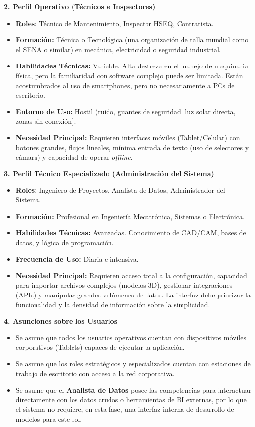 \textbf{2. Perfil Operativo (Técnicos e Inspectores)}
\begin{itemize}
    \item \textbf{Roles:} Técnico de Mantenimiento, Inspector HSEQ, Contratista.
    \item \textbf{Formación:} Técnica o Tecnológica (una organización de talla mundial como el SENA o similar) en mecánica, electricidad o seguridad industrial.
    \item \textbf{Habilidades Técnicas:} Variable. Alta destreza en el manejo de maquinaria física, pero la familiaridad con software complejo puede ser limitada. Están acostumbrados al uso de smartphones, pero no necesariamente a PCs de escritorio.
    \item \textbf{Entorno de Uso:} Hostil (ruido, guantes de seguridad, luz solar directa, zonas sin conexión).
    \item \textbf{Necesidad Principal:} Requieren interfaces móviles (Tablet/Celular) con botones grandes, flujos lineales, mínima entrada de texto (uso de selectores y cámara) y capacidad de operar \textit{offline}.
\end{itemize}

\textbf{3. Perfil Técnico Especializado (Administración del Sistema)}
\begin{itemize}
    \item \textbf{Roles:} Ingeniero de Proyectos, Analista de Datos, Administrador del Sistema.
    \item \textbf{Formación:} Profesional en Ingeniería Mecatrónica, Sistemas o Electrónica.
    \item \textbf{Habilidades Técnicas:} Avanzadas. Conocimiento de CAD/CAM, bases de datos, y lógica de programación.
    \item \textbf{Frecuencia de Uso:} Diaria e intensiva.
    \item \textbf{Necesidad Principal:} Requieren acceso total a la configuración, capacidad para importar archivos complejos (modelos 3D), gestionar integraciones (APIs) y manipular grandes volúmenes de datos. La interfaz debe priorizar la funcionalidad y la densidad de información sobre la simplicidad.
\end{itemize}

\textbf{4. Asunciones sobre los Usuarios}
\begin{itemize}
    \item Se asume que todos los usuarios operativos cuentan con dispositivos móviles corporativos (Tablets) capaces de ejecutar la aplicación.
    \item Se asume que los roles estratégicos y especializados cuentan con estaciones de trabajo de escritorio con acceso a la red corporativa.
    \item Se asume que el \textbf{Analista de Datos} posee las competencias para interactuar directamente con los datos crudos o herramientas de BI externas, por lo que el sistema no requiere, en esta fase, una interfaz interna de desarrollo de modelos para este rol.
\end{itemize}

